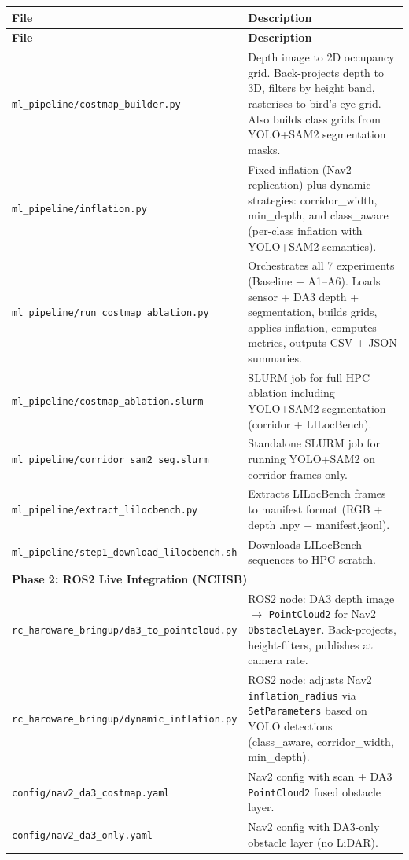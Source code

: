 \documentclass[11pt,a4paper]{article}
\begin{document}
\begin{longtable}{lp{9cm}}
\toprule
\textbf{File} & \textbf{Description} \\
\midrule
\endfirsthead
\toprule
\textbf{File} & \textbf{Description} \\
\midrule
\endhead
\texttt{ml\_pipeline/costmap\_builder.py} & Depth image to 2D occupancy grid.
  Back-projects depth to 3D, filters by height band, rasterises to bird's-eye
  grid. Also builds class grids from YOLO+SAM2 segmentation masks. \\
\texttt{ml\_pipeline/inflation.py} & Fixed inflation (Nav2 replication) plus
  dynamic strategies: corridor\_width, min\_depth, and class\_aware
  (per-class inflation with YOLO+SAM2 semantics). \\
\texttt{ml\_pipeline/run\_costmap\_ablation.py} & Orchestrates all 7 experiments
  (Baseline + A1--A6). Loads sensor + DA3 depth + segmentation, builds grids,
  applies inflation, computes metrics, outputs CSV + JSON summaries. \\
\texttt{ml\_pipeline/costmap\_ablation.slurm} & SLURM job for full HPC ablation
  including YOLO+SAM2 segmentation (corridor + LILocBench). \\
\texttt{ml\_pipeline/corridor\_sam2\_seg.slurm} & Standalone SLURM job for
  running YOLO+SAM2 on corridor frames only. \\
\texttt{ml\_pipeline/extract\_lilocbench.py} & Extracts LILocBench frames to
  manifest format (RGB + depth .npy + manifest.jsonl). \\
\texttt{ml\_pipeline/step1\_download\_lilocbench.sh} & Downloads LILocBench
  sequences to HPC scratch. \\
\midrule
\multicolumn{2}{l}{\textbf{Phase 2: ROS2 Live Integration (NCHSB)}} \\
\midrule
\texttt{rc\_hardware\_bringup/da3\_to\_pointcloud.py} & ROS2 node:
  DA3 depth image $\to$ \texttt{PointCloud2} for Nav2 \texttt{ObstacleLayer}.
  Back-projects, height-filters, publishes at camera rate. \\
\texttt{rc\_hardware\_bringup/dynamic\_inflation.py} & ROS2 node:
  adjusts Nav2 \texttt{inflation\_radius} via \texttt{SetParameters}
  based on YOLO detections (class\_aware, corridor\_width, min\_depth). \\
\texttt{config/nav2\_da3\_costmap.yaml} & Nav2 config with scan + DA3
  \texttt{PointCloud2} fused obstacle layer. \\
\texttt{config/nav2\_da3\_only.yaml} & Nav2 config with DA3-only
  obstacle layer (no LiDAR). \\

\end{longtable}
\end{document}
